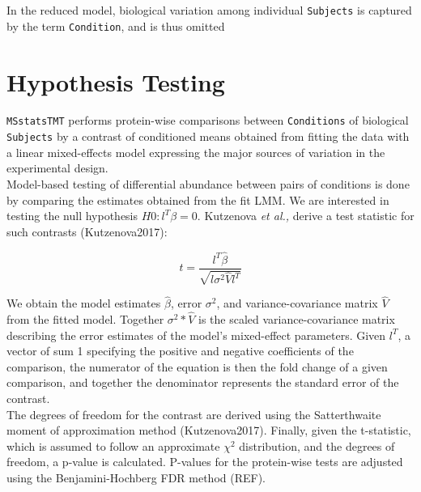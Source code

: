\documentclass[11pt]{elife}\usepackage[]{graphicx}\usepackage[]{color}
\begin{document}
In the reduced model, biological variation among individual \texttt{Subjects} is 
captured by the term \texttt{Condition}, and is thus omitted\\


\section{Hypothesis Testing}

\texttt{MSstatsTMT} performs protein-wise
comparisons between \texttt{Conditions} of biological \texttt{Subjects} by 
a contrast of conditioned means obtained from fitting the data with a
linear mixed-effects model expressing the major sources of variation in the
experimental design.\\

Model-based testing of differential abundance between pairs of conditions
is done by comparing the estimates obtained from the fit LMM. We are interested 
in testing the null hypothesis $H0 : l^T\beta = 0$. Kutzenova \textit{et al.,}
derive a test statistic for such contrasts (Kutzenova2017):

\begin{equation}
	t = \frac{l^T \hat{\beta}}{\sqrt{l \sigma^2 \hat{V} l^T}}
\end{equation}

We obtain the model estimates $\hat{\beta}$, 
error $\sigma^2$, and
variance-covariance matrix $\hat{V}$ from the fitted model. 
Together $\sigma^2 * \hat{V}$ is the scaled variance-covariance matrix
describing the error estimates of the model's mixed-effect parameters. 
Given $l^T$, a vector of sum 1 specifying the positive and negative
coefficients of the comparison, the numerator of the equation is then
the fold change of a given comparison, and together the denominator 
represents the standard error of the contrast.\\

The degrees of freedom for the contrast are derived using the Satterthwaite
moment of approximation method (Kutzenova2017).
Finally, given the t-statistic, which is assumed to follow an approximate
$\chi^2$ distribution, and the degrees of freedom, a p-value is calculated. 
P-values for the protein-wise tests are adjusted using the
Benjamini-Hochberg FDR method (REF).\\
\end{document}
